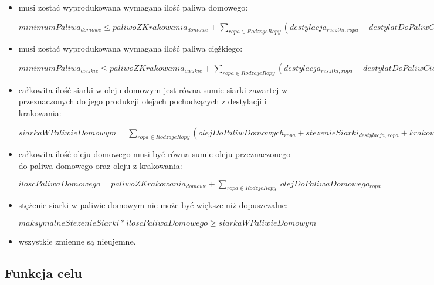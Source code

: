 \documentclass[polish,12pt,titlepage]{article}
\begin{document}
\begin{itemize}
    \item musi zostać wyprodukowana wymagana ilość paliwa domowego:
    \begin{center}
    $minimumPaliwa_{domowe} \leq paliwoZKrakowania_{domowe} + \sum_{ropa \in RodzajeRopy} ( destylacja_{resztki,ropa} + destylatDoPaliwCiezkich_{ropa} + olejDoCiezkiegoOleju_{ropa} )$
    \end{center}

    \item musi zostać wyprodukowana wymagana ilość paliwa ciężkiego:
    \begin{center}
    $minimumPaliwa_{ciezkie} \leq paliwoZKrakowania_{ciezkie} + \sum_{ropa \in RodzajeRopy} ( destylacja_{resztki,ropa} + destylatDoPaliwCiezkich_{ropa} + olejDoPaliwCiezkich_{ropa} )$
    \end{center}

    \item całkowita ilość siarki w oleju domowym jest równa sumie siarki zawartej w przeznaczonych do jego produkcji olejach pochodzących z destylacji i krakowania:
    \begin{center}
    $siarkaWPaliwieDomowym = \sum_{ropa \in RodzajeRopy} ( olejDoPaliwDomowych_{ropa} + stezenieSiarki_{destylacja,ropa} + krakowanie_{olej,ropa} * stezenieSiarki_{krakowanie,ropa} )$
    \end{center}
    
    \item całkowita ilość oleju domowego musi być równa sumie oleju przeznaczonego do paliwa domowego oraz oleju z krakowania:
    \begin{center}
    $iloscPaliwaDomowego = paliwoZKrakowania_{domowe} + \sum_{ropa \in RodzjeRopy} \; olejDoPaliwaDomowego_{ropa}$
    \end{center}
    
    \item stężenie siarki w paliwie domowym nie może być większe niż dopuszczalne:
    \begin{center}
    $maksymalneStezenieSiarki * iloscPaliwaDomowego \geq siarkaWPaliwieDomowym$
    \end{center}
    
    \item wszystkie zmienne są nieujemne.
\end{itemize}

\subsection{Funkcja celu}
\end{document}
